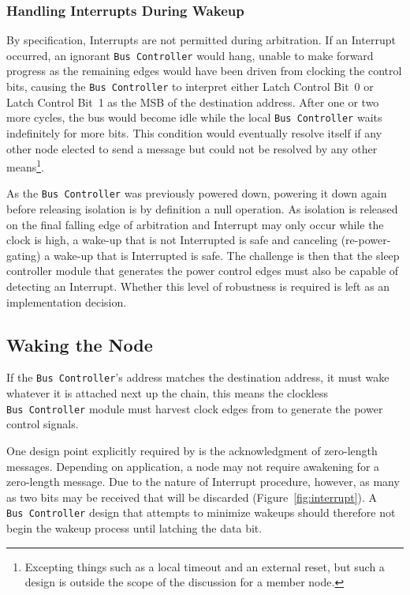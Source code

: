 \subsubsection{Handling Interrupts During Wakeup}
\label{sec:power-bus-controller-wakeup-int}
By specification, Interrupts are not permitted during arbitration. If an
Interrupt occurred, an ignorant {\tt Bus~Controller} would hang, unable to
make forward progress as the remaining edges would have been driven from
clocking the control bits, causing the {\tt Bus~Controller} to interpret
either Latch Control Bit~0 or Latch Control Bit~1 as the MSB of the
destination address. After one or two more cycles, the bus would become idle
while the local {\tt Bus~Controller} waits indefinitely for more bits. This
condition would eventually resolve itself if any other node elected to send a
message but could not be resolved by any other means\footnote{
  Excepting things such as a local timeout and an external reset, but such
  a design is outside the scope of the discussion for a \bus member node.}.

As the {\tt Bus~Controller} was previously powered down, powering it down
again before releasing isolation is by definition a null operation. As
isolation is released on the final falling edge of arbitration and Interrupt
may only occur while the clock is high, a wake-up that is not Interrupted is
safe and canceling (re-power-gating) a wake-up that is Interrupted is safe.
The challenge is then that the sleep controller module that generates the
power control edges must also be capable of detecting an Interrupt. Whether
this level of robustness is required is left as an implementation decision.

\subsection{Waking the Node}
If the {\tt Bus~Controller}'s address matches the destination address, it must
wake whatever it is attached next up the chain, this means the clockless
{\tt Bus~Controller} module must harvest clock edges from \bus to generate the
power control signals.

One design point explicitly required by \bus is the acknowledgment of
zero-length messages. Depending on application, a node may not require
awakening for a zero-length message. Due to the nature of \bus Interrupt
procedure, however, as many as two bits may be received that will be discarded
(Figure~\ref{fig:interrupt}). A {\tt Bus~Controller} design that attempts to
minimize wakeups should therefore not begin the wakeup process until latching
the {\em {}} data bit.

